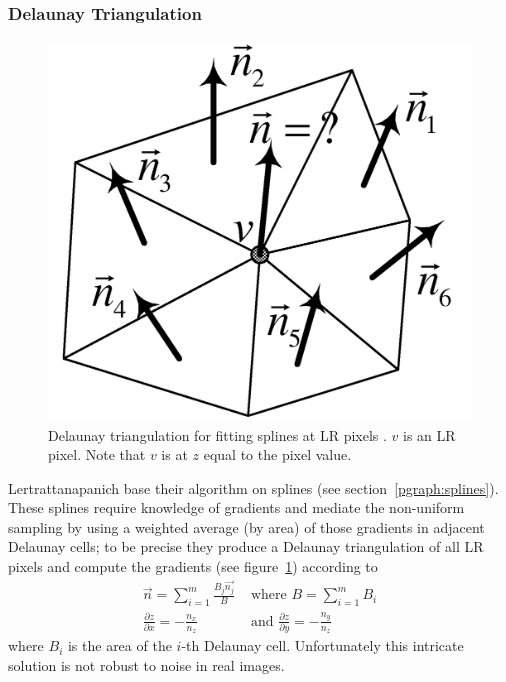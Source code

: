 %
\subsubsection{Delaunay Triangulation}

\begin{figure}[!htbp]
    \centering
    \includegraphics[width=.7\linewidth]{figures/classical/delauney.png}
    \caption{Delaunay triangulation for fitting splines at LR pixels \cite{Lertrattanapanich}. \(v\) is an LR pixel. Note that \(v\) is at \(z\) equal to the pixel value.}
    \label{fig:delauney}
\end{figure}

Lertrattanapanich \etal \cite{Lertrattanapanich} base their algorithm on splines (see section~\ref{pgraph:splines}).
%
These splines require knowledge of gradients and mediate the non-uniform sampling by using a weighted average (by area) of those gradients in adjacent Delaunay cells; to be precise they produce a Delaunay triangulation of all LR pixels and compute the gradients (see figure~\ref{fig:delauney}) according to
\begin{align*}
    \vec{n} = \sum_{i=1}^m \frac{B_j \vec{n_j}}{B}   & \text{ where } B=\sum_{i=1}^m B_i                              \\
    \frac{\partial z}{\partial x} = -\frac{n_x}{n_z} & \text{ and }  \frac{\partial z}{\partial y} = -\frac{n_y}{n_z}
\end{align*}
where \(B_i\) is the area of the \(i\)-th Delaunay cell.
%
Unfortunately this intricate solution is not robust to noise in real images.
